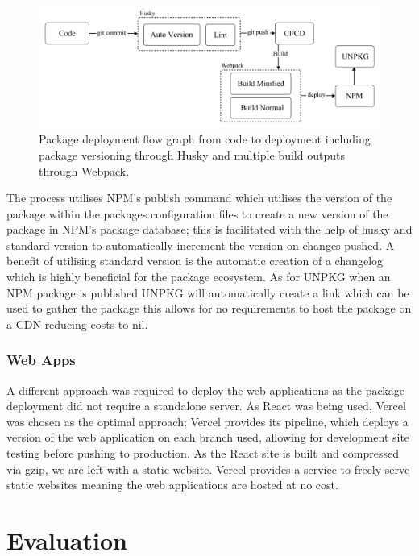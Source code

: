 \documentclass{l4proj}
\begin{document}
\begin{figure}[H]
    \begin{center}
    \includegraphics[width=14cm]{dissertation/images/Deployment.png}
    \end{center}
    \caption{Package deployment flow graph from code to deployment including package versioning through Husky and multiple build outputs through Webpack.}
    \label{fig:deployment}
\end{figure}

The process utilises NPM's publish command which utilises the version of the package within the packages configuration files to create a new version of the package in NPM's package database; this is facilitated with the help of husky and standard version to automatically increment the version on changes pushed. A benefit of utilising standard version is the automatic creation of a changelog which is highly beneficial for the package ecosystem. As for UNPKG when an NPM package is published UNPKG will automatically create a link which can be used to gather the package this allows for no requirements to host the package on a CDN reducing costs to nil.

\subsection{Web Apps}
A different approach was required to deploy the web applications as the package deployment did not require a standalone server. As React was being used, Vercel was chosen as the optimal approach; Vercel provides its pipeline, which deploys a version of the web application on each branch used, allowing for development site testing before pushing to production. As the React site is built and compressed via gzip, we are left with a static website. Vercel provides a service to freely serve static websites meaning the web applications are hosted at no cost. 


\chapter{Evaluation} 
\end{document}
